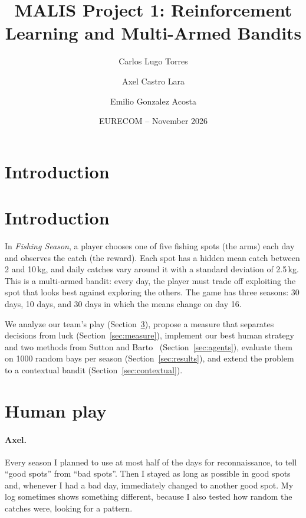 \documentclass[11pt,a4paper]{article}
\title{MALIS Project 1: Reinforcement Learning and Multi-Armed Bandits}
\author{Carlos Lugo Torres \and Axel Castro Lara \and Emilio Gonzalez Acosta}
\date{EURECOM -- November 2026}
\begin{document}
\maketitle

\section{Introduction}               %
\section{Introduction}

In \emph{Fishing Season}, a player chooses one of five fishing spots (the arms)
each day and observes the catch (the reward). Each spot has a hidden mean catch
between 2 and 10\,kg, and daily catches vary around it with a standard deviation
of 2.5\,kg. This is a multi-armed bandit: every day, the player must trade off
exploiting the spot that looks best against exploring the others. The game has
three seasons: 30 days, 10 days, and 30 days in which the means change on day 16.

We analyze our team's play (Section~\ref{sec:human}), propose a measure that
separates decisions from luck (Section~\ref{sec:measure}), implement our best
human strategy and two methods from Sutton and Barto~\cite{sutton}
(Section~\ref{sec:agents}), evaluate them on 1000 random bays per season
(Section~\ref{sec:results}), and extend the problem to a contextual bandit
(Section~\ref{sec:contextual}).

\section{Human play}
\label{sec:human}

\paragraph{Axel.} Every season I planned to use at most half of the days for
reconnaissance, to tell ``good spots'' from ``bad spots''. Then I stayed as long
as possible in good spots and, whenever I had a bad day, immediately changed to
another good spot. My log sometimes shows something different, because I also
tested how random the catches were, looking for a pattern.
\end{document}
